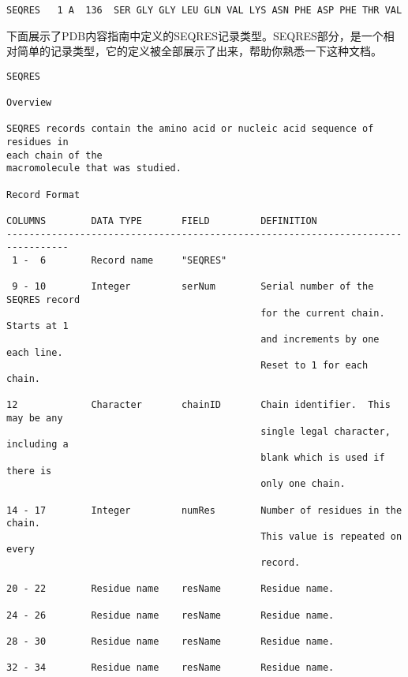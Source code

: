 \begin{lstlisting}
SEQRES   1 A  136  SER GLY GLY LEU GLN VAL LYS ASN PHE ASP PHE THR VAL
\end{lstlisting}

下面展示了PDB内容指南中定义的SEQRES记录类型。SEQRES部分，是一个相对简单的记录类型，它的定义被全部展示了出来，帮助你熟悉一下这种文档。

\begin{lstlisting}
SEQRES 
 
Overview 

SEQRES records contain the amino acid or nucleic acid sequence of residues in
each chain of the 
macromolecule that was studied. 

Record Format 

COLUMNS        DATA TYPE       FIELD         DEFINITION                           
---------------------------------------------------------------------------------
 1 -  6        Record name     "SEQRES"                                           

 9 - 10        Integer         serNum        Serial number of the SEQRES record   
                                             for the current chain.  Starts at 1  
                                             and increments by one each line.     
                                             Reset to 1 for each chain.           

12             Character       chainID       Chain identifier.  This may be any   
                                             single legal character, including a  
                                             blank which is used if there is      
                                             only one chain.                      

14 - 17        Integer         numRes        Number of residues in the chain.     
                                             This value is repeated on every      
                                             record.                              

20 - 22        Residue name    resName       Residue name.                        

24 - 26        Residue name    resName       Residue name.                        

28 - 30        Residue name    resName       Residue name.                        

32 - 34        Residue name    resName       Residue name.                        


\end{lstlisting}

